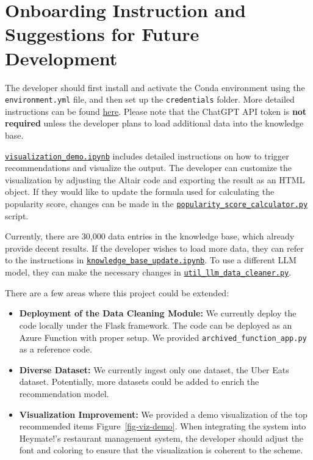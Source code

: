 \documentclass[
  11pt,
  a4paper,
  DIV=11,
  numbers=noendperiod]{scrartcl}
\providecommand{\tightlist}{%
  \setlength{\itemsep}{0pt}\setlength{\parskip}{0pt}}\usepackage{longtable,booktabs,array}
\begin{document}
\section{Onboarding Instruction and Suggestions for Future
Development}\label{onboarding-instruction-and-suggestions-for-future-development}

The developer should first install and activate the Conda environment
using the \texttt{environment.yml} file, and then set up the
\texttt{credentials} folder. More detailed instructions can be found
\href{https://github.com/UBC-MDS/heymate-report}{here}. Please note that
the ChatGPT API token is \textbf{not required} unless the developer
plans to load additional data into the knowledge base.

\href{https://github.com/UBC-MDS/heymate-report/blob/readme-update/script/visualization_demo.ipynb}{\texttt{visualization\_demo.ipynb}}
includes detailed instructions on how to trigger recommendations and
visualize the output. The developer can customize the visualization by
adjusting the Altair code and exporting the result as an HTML object. If
they would like to update the formula used for calculating the
popularity score, changes can be made in the
\href{https://github.com/UBC-MDS/heymate-report/blob/readme-update/script/popularity_score_calculator.py}{\texttt{popularity\_score\_calculator.py}}
script.

Currently, there are 30,000 data entries in the knowledge base, which
already provide decent results. If the developer wishes to load more
data, they can refer to the instructions in
\href{https://github.com/UBC-MDS/heymate-report/blob/readme-update/script/knowledge_base_update.ipynb}{\texttt{knowledge\_base\_update.ipynb}}.
To use a different LLM model, they can make the necessary changes in
\href{https://github.com/UBC-MDS/heymate-report/blob/readme-update/script/util_llm_data_cleaner.py}{\texttt{util\_llm\_data\_cleaner.py}}.

There are a few areas where this project could be extended:

\begin{itemize}
\tightlist
\item
  \textbf{Deployment of the Data Cleaning Module:} We currently deploy
  the code locally under the Flask framework. The code can be deployed
  as an Azure Function with proper setup. We provided
  \texttt{archived\_function\_app.py} as a reference code.
\item
  \textbf{Diverse Dataset:} We currently ingest only one dataset, the
  Uber Eats dataset. Potentially, more datasets could be added to enrich
  the recommendation model.
\item
  \textbf{Visualization Improvement:} We provided a demo visualization
  of the top recommended items Figure~\ref{fig-viz-demo}. When
  integrating the system into Heymate!'s restaurant management system,
  the developer should adjust the font and coloring to ensure that the
  visualization is coherent to the scheme.
\end{itemize}
\end{document}
